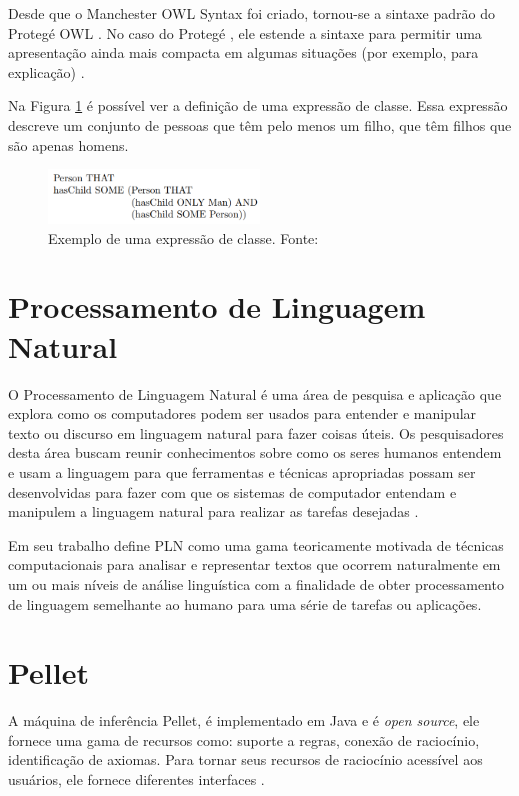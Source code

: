 \documentclass{bcc}
\begin{document}
Desde que o Manchester OWL Syntax foi criado, tornou-se a sintaxe padrão do Protegé OWL \cite{horridge2006}. No caso do Protegé \cite{noy2001}, ele estende a sintaxe para permitir uma apresentação ainda mais compacta em algumas situações (por exemplo, para explicação) \cite{horridge2009}.

Na Figura \ref{fig:manchester_exemplo} é possível ver a definição de uma expressão de classe. Essa expressão descreve um conjunto de pessoas que têm pelo menos um filho, que têm filhos que são apenas homens.

\begin{figure}[H]
\centering
\includegraphics[width=0.5\textwidth]{Figuras/manchester_exemplo.png}
\caption{Exemplo de uma expressão de classe. Fonte: \cite{horridge2006}}
\label{fig:manchester_exemplo}
\end{figure}

\section{Processamento de Linguagem Natural}

O Processamento de Linguagem Natural é uma área de pesquisa e aplicação que explora como os computadores podem ser usados para entender e manipular texto ou discurso em linguagem natural para fazer coisas úteis. Os pesquisadores desta área buscam reunir conhecimentos sobre como os seres humanos entendem e usam a linguagem para que ferramentas e técnicas apropriadas possam ser desenvolvidas para fazer com que os sistemas de computador entendam e manipulem a linguagem natural para realizar as tarefas desejadas \cite{chowdhury2003}.

Em seu trabalho \cite{liddy2001} define PLN como uma gama teoricamente motivada de técnicas computacionais para analisar e representar textos que ocorrem naturalmente em um ou mais níveis de análise linguística com a finalidade de obter processamento de linguagem semelhante ao humano para uma série de tarefas ou aplicações.

\section{Pellet}

A máquina de inferência Pellet, é implementado em Java e é \textit{open source}, ele fornece uma gama de recursos como: suporte a regras, conexão de raciocínio, identificação de axiomas. Para tornar seus recursos de raciocínio acessível aos usuários, ele fornece diferentes interfaces \cite{sirin2007}. 
\end{document}
